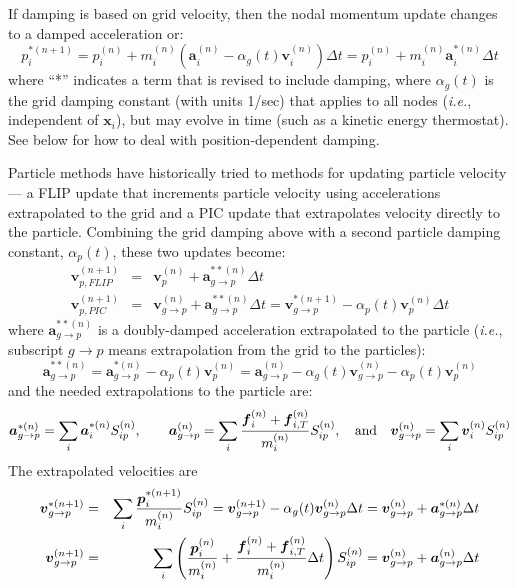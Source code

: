 \documentclass[11pt]{article}
\renewcommand{\vec}[1]{\boldsymbol{#1}}
\begin{document}
If damping is based on grid velocity, then the nodal momentum update changes to a damped acceleration or:
\begin{equation}
     p_i^{*(n+1)} = p_i^{(n)} +  m_i^{(n)}(\vec a_i^{(n)}-\alpha_g(t)\vec v_i^{(n)})\Delta t = p_i^{(n)} +  m_i^{(n)}\vec a_i^{*(n)}\Delta t
\end{equation}
where ``*'' indicates a term that is revised to include damping,
where $\alpha_g(t)$ is the grid damping constant (with units 1/sec) that applies to all nodes (\emph{i.e.}, independent of $\vec x_i$), but may evolve in time (such as a kinetic energy thermostat). See below for how to deal with position-dependent damping.

Particle methods have historically tried to methods for updating particle velocity --- a FLIP update that increments particle velocity using accelerations extrapolated to the grid and a PIC update that extrapolates velocity directly to the particle. Combining the grid damping above with a second particle damping constant, $\alpha_p(t)$, these two updates become:
\begin{eqnarray}
      \vec{v}_{p,FLIP}^{(n+1)}  & = & \vec{v}_p^{(n)} + \vec{a}_{g\to p}^{**(n)} \Delta t   \\
      \vec{v}_{p,PIC}^{(n+1)}  & = &  \vec v_{g\to p}^{(n)} + \vec{a}_{g\to p}^{**(n)} \Delta t 
         = \vec v_{g\to p}^{*(n+1)} - \alpha_p(t)\vec{v}_p^{(n)}\Delta t
\end{eqnarray}
where $\vec{a}_{g\to p}^{**(n)}$ is a doubly-damped acceleration extrapolated to the particle (\emph{i.e.}, subscript $g\to p$ means extrapolation from the grid to the particles):
\begin{equation}
    \vec{a}_{g\to p}^{**(n)} = \vec{a}_{g\to p}^{*(n)} -  \alpha_p(t)\vec{v}_p^{(n)}
    =  \vec{a}_{g\to p}^{(n)} -  \alpha_g(t)\vec v_{g\to p}^{(n)}    -  \alpha_p(t)\vec{v}_p^{(n)} 
\end{equation}
and the needed extrapolations to the particle are:
\begin{equation}
    \vec{a}_{g\to p}^{*(n)} = \sum_i  \vec a_i^{*(n)} S_{ip}^{(n)},   \qquad
    \vec{a}_{g\to p}^{(n)} = \sum_i { \vec f_{i}^{(n)} + \vec f_{i,T}^{(n)} \over m_i^{(n)}} S_{ip}^{(n)}  , 
    \quad {\rm and}\quad \vec v_{g\to p}^{(n)} = \sum_i  \vec v_i^{(n)} S_{ip}^{(n)}
\end{equation}
The extrapolated velocities are
\begin{eqnarray}
      \vec v_{g\to p}^{*(n+1)} & = & \sum_i  {\vec p_i^{*(n+1)} \over m_i^{(n)}}S_{ip}^{(n)}
       = \vec v_{g\to p}^{(n+1)} - \alpha_g(t)\vec v_{g\to p}^{(n)}\Delta t  = \vec v_{g\to p}^{(n)} + \vec{a}_{g\to p}^{*(n)}\Delta t  \\ 
       \vec v_{g\to p}^{(n+1)} & = & 
          \sum_i  \left({\vec p_i^{(n)} \over m_i^{(n)}}+{ \vec f_{i}^{(n)} + \vec f_{i,T}^{(n)} \over m_i^{(n)}}\Delta t\right) S_{ip}^{(n)} 
          = \vec v_{g\to p}^{(n)} + \vec{a}_{g\to p}^{(n)}\Delta t  \label{vgpJump}
\end{eqnarray}
\end{document}

